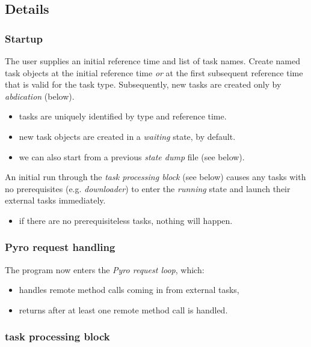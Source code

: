 \documentclass[12pt]{amsart}
\begin{document}
\subsection{Details}

\subsubsection{Startup}

The user supplies an initial reference time and list of task names.
Create named task objects at the initial reference time {\em or} at the
first subsequent reference time that is valid for the task type.
Subsequently, new tasks are created only by {\em abdication} (below).
    \begin{itemize}
        \item tasks are uniquely identified by type and reference time. 
        \item new task objects are created in a {\em waiting} state, by
        default.
        \item we can also start from a previous {\em state dump} file
        (see below).
    \end{itemize}


An initial run through the {\em task processing block} (see below)
causes any tasks with no prerequisites (e.g. {\em downloader}) to enter the
{\em running} state and launch their external tasks immediately.
    \begin{itemize}
    \item if there are no prerequisiteless tasks, nothing will happen.
    \end{itemize}

\subsubsection{Pyro request handling}

The program now enters the {\em Pyro request loop}, which:

    \begin{itemize}
    \item handles remote method calls coming in from external tasks, 
    \item returns after at least one remote method call is handled. 
    \end{itemize}

\subsubsection{task processing block} 
\end{document}
